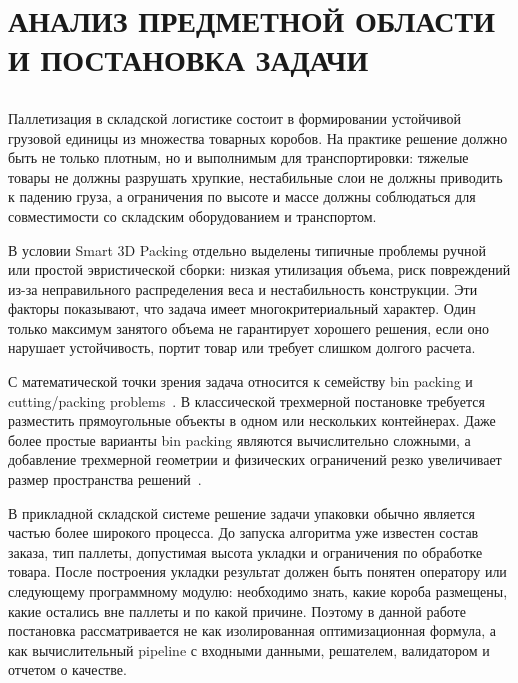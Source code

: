 \clearpage
\section[\MakeUppercase{Анализ предметной области и постановка задачи}]{\centering\MakeUppercase{Анализ предметной области и постановка задачи}}

\subsection{}

Паллетизация в складской логистике состоит в формировании устойчивой грузовой единицы из множества товарных коробов. На практике решение должно быть не только плотным, но и выполнимым для транспортировки: тяжелые товары не должны разрушать хрупкие, нестабильные слои не должны приводить к падению груза, а ограничения по высоте и массе должны соблюдаться для совместимости со складским оборудованием и транспортом.

В условии Smart 3D Packing отдельно выделены типичные проблемы ручной или простой эвристической сборки: низкая утилизация объема, риск повреждений из-за неправильного распределения веса и нестабильность конструкции. Эти факторы показывают, что задача имеет многокритериальный характер. Один только максимум занятого объема не гарантирует хорошего решения, если оно нарушает устойчивость, портит товар или требует слишком долгого расчета.

С математической точки зрения задача относится к семейству bin packing и cutting/packing problems~\cite{wassenhove1982}. В классической трехмерной постановке требуется разместить прямоугольные объекты в одном или нескольких контейнерах. Даже более простые варианты bin packing являются вычислительно сложными, а добавление трехмерной геометрии и физических ограничений резко увеличивает размер пространства решений~\cite{martello2000,lodi2002}.

В прикладной складской системе решение задачи упаковки обычно является частью более широкого процесса. До запуска алгоритма уже известен состав заказа, тип паллеты, допустимая высота укладки и ограничения по обработке товара. После построения укладки результат должен быть понятен оператору или следующему программному модулю: необходимо знать, какие короба размещены, какие остались вне паллеты и по какой причине. Поэтому в данной работе постановка рассматривается не как изолированная оптимизационная формула, а как вычислительный pipeline с входными данными, решателем, валидатором и отчетом о качестве.

